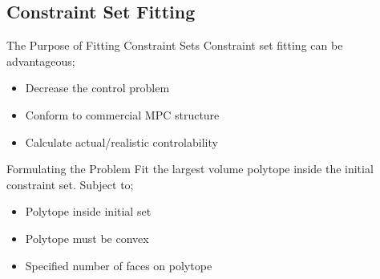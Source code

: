 \documentclass{beamer}
\begin{document}
\subsection{Constraint Set Fitting}

\begin{frame}{The Purpose of Fitting Constraint Sets}
Constraint set fitting can be advantageous;
  \begin{itemize}
    \item
      Decrease the control problem
    \item
      Conform to commercial MPC structure
    \item
      Calculate actual/realistic controlability
  \end{itemize}
\end{frame}

\begin{frame}{Formulating the Problem}
Fit the largest volume polytope inside the initial constraint set.
\vfill
Subject to;
  \begin{itemize}
    \item
      Polytope inside initial set
    \item
      Polytope must be convex
    \item
      Specified number of faces on polytope
  \end{itemize}
\vfill
\end{frame}
\end{document}
